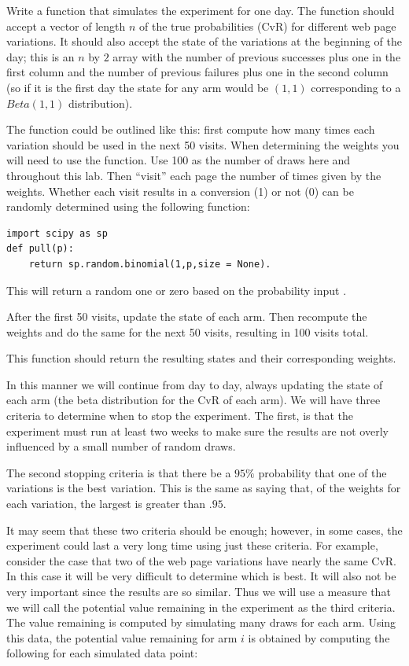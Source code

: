 \begin{problem}
Write a function that simulates the experiment for one day.  The function should accept a vector of length $n$ of the true probabilities (CvR) for different web page variations.  It should also accept the state of the variations at the beginning of the day; this is an $n$ by $2$ array with the number of previous successes plus one in the first column and the number of previous failures plus one in the second column (so if it is the first day the state for any arm would be $(1,1)$ corresponding to a $Beta(1,1)$ distribution).

The function could be outlined like this: first compute how many times each variation should be used in the next 50 visits.  When determining the weights you will need to use the  function.  Use 100 as the number of draws here and throughout this lab.  Then ``visit'' each page the number of times given by the weights.  Whether each visit results in a conversion (1) or not (0) can be randomly determined using the following function:

\begin{lstlisting}
import scipy as sp
def pull(p):
    return sp.random.binomial(1,p,size = None).
\end{lstlisting}
This will return a random one or zero based on the probability input .

After the first 50 visits, update the state of each arm.  Then recompute the weights and do the same for the next 50 visits, resulting in 100 visits total.

This function should return the resulting states and their corresponding weights.
\end{problem}

In this manner we will continue from day to day, always updating the state of each arm (the beta distribution for the CvR of each arm).  We will have three criteria to determine when to stop the experiment.  The first, is that the experiment must run at least two weeks to make sure the results are not overly influenced by a small number of random draws.

The second stopping criteria is that there be a $95\%$ probability that one of the variations is the best variation.  This is the same as saying that, of the weights for each variation, the largest is greater than $.95$.

It may seem that these two criteria should be enough; however, in some cases, the experiment could last a very long time using just these criteria.  For example, consider the case that two of the web page variations have nearly the same CvR.  In this case it will be very difficult to determine which is best.  It will also not be very important since the results are so similar.  Thus we will use a measure that we will call the potential value remaining in the experiment as the third criteria.  The value remaining is computed by simulating many draws for each arm.  Using this data, the potential value remaining for arm $i$ is obtained by computing the following for each simulated data point:

